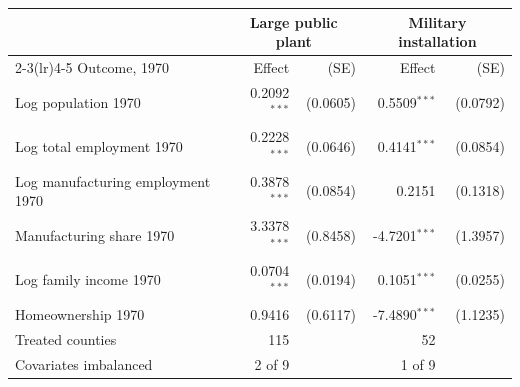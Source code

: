 \begin{tabular}{lrrrr}
\toprule
& \multicolumn{2}{c}{Large public plant} & \multicolumn{2}{c}{Military installation} \\
\cmidrule(lr){2-3}\cmidrule(lr){4-5}
Outcome, 1970 & Effect & (SE) & Effect & (SE) \\
\midrule
Log population 1970 & 0.2092$^{***}$ & (0.0605) & 0.5509$^{***}$ & (0.0792) \\
Log total employment 1970 & 0.2228$^{***}$ & (0.0646) & 0.4141$^{***}$ & (0.0854) \\
Log manufacturing employment 1970 & 0.3878$^{***}$ & (0.0854) & 0.2151 & (0.1318) \\
\addlinespace
Manufacturing share 1970 & 3.3378$^{***}$ & (0.8458) & -4.7201$^{***}$ & (1.3957) \\
Log family income 1970 & 0.0704$^{***}$ & (0.0194) & 0.1051$^{***}$ & (0.0255) \\
Homeownership 1970 & 0.9416 & (0.6117) & -7.4890$^{***}$ & (1.1235) \\
\midrule
Treated counties & 115 & & 52 & \\
Covariates imbalanced & 2 of 9 & & 1 of 9 & \\
\bottomrule
\end{tabular}